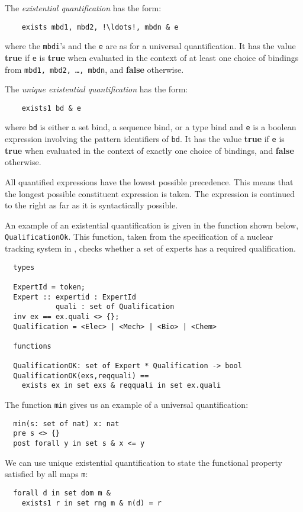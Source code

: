 \documentclass{overturerepchap}
\newcommand{\keyw}[1]{{\bf\ttfamily #1}}
\begin{document}
{\begin{description}
  The {\it existential quantification} has the form:
  \begin{lstlisting}
    exists mbd1, mbd2, !\ldots!, mbdn & e
  \end{lstlisting}
  where the {\tt mbdi}'s and the {\tt e} are as for a universal
  quantification. It has the value \keyw{true} if {\tt e} is \keyw{true} when
  evaluated in the context of at least one choice of bindings from
  {\tt mbd1, mbd2, \ldots, mbdn}, and \keyw{false} otherwise.

  The {\it unique existential quantification} has the form:
  \begin{lstlisting}
    exists1 bd & e
  \end{lstlisting}
  where {\tt bd} is either a set bind, a sequence bind, or a type bind and {\tt e} is a
  boolean expression involving the pattern identifiers of {\tt bd}. It
  has the value \keyw{true} if {\tt e} is \keyw{true} when evaluated in the
  context of exactly one choice of bindings, and \keyw{false} otherwise.

  All quantified expressions have the lowest possible precedence. This
  means that the longest possible constituent expression is taken. The
  expression is continued to the right as far as it is syntactically
  possible.


\item[Examples:]
  An example of an existential quantification is given in the function
  shown below, \texttt{QualificationOk}. This function, taken from the
  specification of a nuclear tracking system in \cite{Fitzgerald&98},
  checks whether a set of experts has a required qualification.
  \begin{lstlisting}
  types

  ExpertId = token;
  Expert :: expertid : ExpertId
            quali : set of Qualification
  inv ex == ex.quali <> {};
  Qualification = <Elec> | <Mech> | <Bio> | <Chem>

  functions

  QualificationOK: set of Expert * Qualification -> bool
  QualificationOK(exs,reqquali) ==
    exists ex in set exs & reqquali in set ex.quali
  \end{lstlisting}
  The function \texttt{min} gives us an example of a universal
  quantification:
  \begin{lstlisting}
  min(s: set of nat) x: nat
  pre s <> {}
  post forall y in set s & x <= y
  \end{lstlisting}
  We can use unique existential quantification to state the functional
  property satisfied by all maps \texttt{m}:
  \begin{lstlisting}
  forall d in set dom m &
    exists1 r in set rng m & m(d) = r
  \end{lstlisting}



\end{description}}
\end{document}

